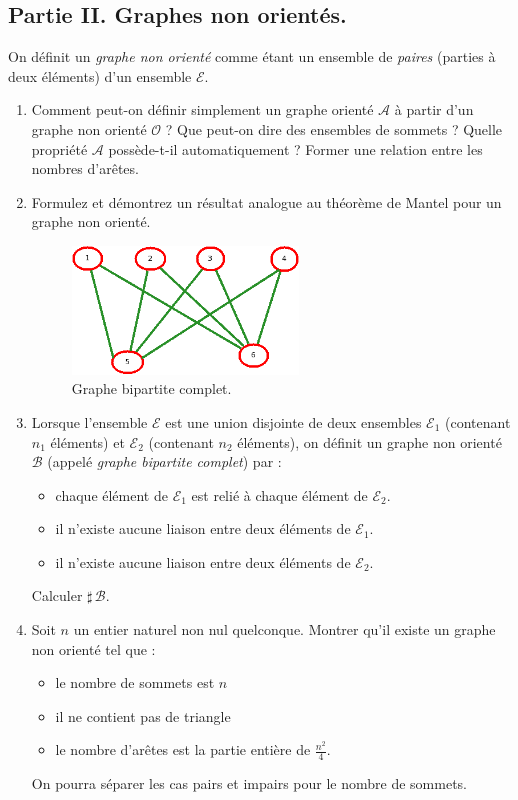 \subsection*{Partie II. Graphes non orientés.}
On définit un \emph{graphe non orienté} comme étant un ensemble de \emph{paires} (parties à deux éléments) d'un ensemble $\mathcal E$.
\begin{enumerate}
\item Comment peut-on définir simplement un graphe orienté $\mathcal A$ à partir d'un graphe non orienté $\mathcal O$ ? Que peut-on dire des ensembles de sommets ? Quelle propriété $\mathcal A$ possède-t-il automatiquement ? Former une relation entre les nombres d'arêtes.
\item Formulez et démontrez un résultat analogue au théorème de Mantel pour un graphe non orienté.

\begin{figure}[ht!]
 \centering
 \includegraphics[width=6cm]{Emantel_2.png}
 \caption{Graphe bipartite complet.}
 \label{fig:Emantel_2}
\end{figure}

\item Lorsque l'ensemble $\mathcal{E}$ est une union disjointe de deux ensembles $\mathcal E_1$ (contenant $n_1$ éléments) et $\mathcal E_2$ (contenant $n_2$ éléments), on définit un graphe non orienté $\mathcal B$ (appelé \emph{graphe bipartite complet}) par :
\begin{itemize}
 \item chaque élément de $\mathcal E_1$ est relié à chaque élément de $\mathcal E_2$.
 \item il n'existe aucune liaison entre deux éléments de $\mathcal E_1$.
 \item il n'existe aucune liaison entre deux éléments de $\mathcal E_2$.
\end{itemize}
Calculer $\sharp\, \mathcal B$.
\item Soit $n$ un entier naturel non nul quelconque.\newline
Montrer qu'il existe un graphe non orienté tel que :
\begin{itemize}
 \item le nombre de sommets est $n$
 \item il ne contient pas de triangle
 \item le nombre d'arêtes est la partie entière de $\frac{n^2}{4}$.
\end{itemize} 
On pourra séparer les cas pairs et impairs pour le nombre de sommets.
\end{enumerate}


